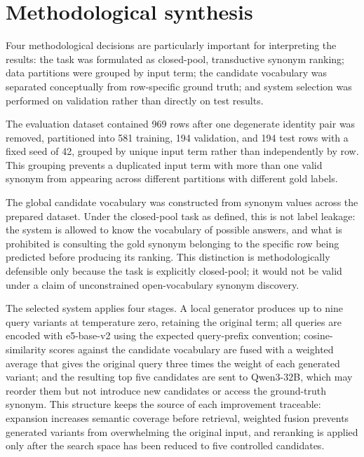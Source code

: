 \section{Methodological synthesis}

Four methodological decisions are particularly important for interpreting the results: the task was formulated as closed-pool, transductive synonym ranking; data partitions were grouped by input term; the candidate vocabulary was separated conceptually from row-specific ground truth; and system selection was performed on validation rather than directly on test results.

The evaluation dataset contained 969 rows after one degenerate identity pair was removed, partitioned into 581 training, 194 validation, and 194 test rows with a fixed seed of 42, grouped by unique input term rather than independently by row. This grouping prevents a duplicated input term with more than one valid synonym from appearing across different partitions with different gold labels.

The global candidate vocabulary was constructed from synonym values across the prepared dataset. Under the closed-pool task as defined, this is not label leakage: the system is allowed to know the vocabulary of possible answers, and what is prohibited is consulting the gold synonym belonging to the specific row being predicted before producing its ranking. This distinction is methodologically defensible only because the task is explicitly closed-pool; it would not be valid under a claim of unconstrained open-vocabulary synonym discovery.

The selected system applies four stages. A local generator produces up to nine query variants at temperature zero, retaining the original term; all queries are encoded with e5-base-v2 using the expected query-prefix convention; cosine-similarity scores against the candidate vocabulary are fused with a weighted average that gives the original query three times the weight of each generated variant; and the resulting top five candidates are sent to Qwen3-32B, which may reorder them but not introduce new candidates or access the ground-truth synonym. This structure keeps the source of each improvement traceable: expansion increases semantic coverage before retrieval, weighted fusion prevents generated variants from overwhelming the original input, and reranking is applied only after the search space has been reduced to five controlled candidates.

